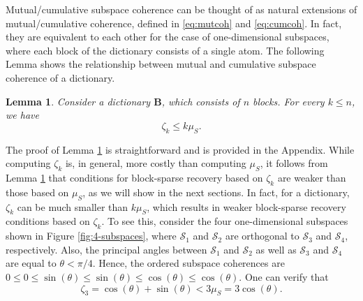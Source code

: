 \documentclass[10pt,twocolumn,twoside] {IEEEtran}
\newtheorem{lemma}{Lemma}
\begin{document}
Mutual/cumulative subspace coherence can be thought of as natural extensions of mutual/cumulative coherence, defined in \eqref{eq:mutcoh} and \eqref{eq:cumcoh}. 
In fact, they are equivalent to each other for the case of one-dimensional subspaces, where each block of the dictionary consists of a single atom. 
The following Lemma shows the relationship between mutual and cumulative subspace coherence of a dictionary.
\vspace{1mm}
\begin{lemma} 
\label{lem:cum-mut}
Consider a dictionary ${\boldsymbol{B}}$, which consists of $n$ blocks. For every $k \leq n$, we have
\begin{equation}
\zeta_k \leq k \mu_S.
\end{equation}
\end{lemma}
\vspace{1mm}
The proof of Lemma \ref{lem:cum-mut} is straightforward and is provided in the Appendix. 
While computing $\zeta_k$ is, in general, more costly than computing $\mu_S$, it follows from Lemma \ref{lem:cum-mut} that conditions for block-sparse recovery based on $\zeta_k$ are weaker than those based on $\mu_S$, as we will show in the next sections. In fact, for a dictionary, $\zeta_k$ can be much smaller than $k \mu_S$, which results in weaker block-sparse recovery conditions based on $\zeta_k$. To see this, consider the four one-dimensional subspaces shown in Figure \ref{fig:4-subspaces}, where $\mathcal{S}_1$ and $\mathcal{S}_2$ are orthogonal to $\mathcal{S}_3$ and $\mathcal{S}_4$, respectively. Also, the principal angles between $\mathcal{S}_1$ and $\mathcal{S}_2$ as well as $\mathcal{S}_3$ and $\mathcal{S}_4$ are equal to $\theta < \pi / 4$. 
Hence, the ordered subspace coherences are 
$0 \leq 0 \leq \sin(\theta) \leq \sin(\theta) \leq \cos(\theta) \leq \cos(\theta)$. One can verify that
\begin{equation*}
\zeta_3 = \cos(\theta)  +  \sin(\theta) <  3 \mu_S = 3\cos(\theta).
\end{equation*}
\end{document}
